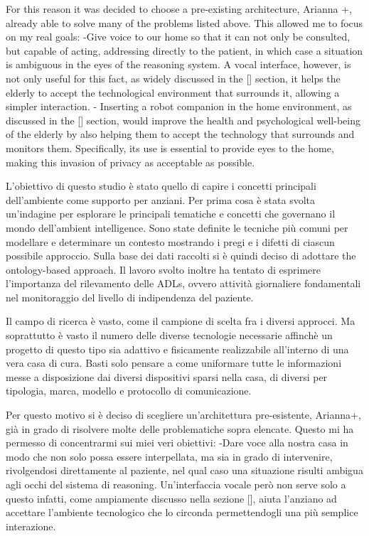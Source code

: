 \documentclass{thesisreport}
\begin{document}
 For this reason it was decided to choose a pre-existing architecture, Arianna +, already able to solve many of the problems listed above. This allowed me to focus on my real goals:
 -Give voice to our home so that it can not only be consulted, but capable of acting, addressing directly to the patient, in which case a situation is ambiguous in the eyes of the reasoning system.
 A vocal interface, however, is not only useful for this fact, as widely discussed in the [] section, it helps the elderly to accept the technological environment that surrounds it, allowing a simpler interaction.
 - Inserting a robot companion in the home environment, as discussed in the [] section, would improve the health and psychological well-being of the elderly by also helping them to accept the technology that surrounds and monitors them. Specifically, its use is essential to provide eyes to the home, making this invasion of privacy as acceptable as possible.
 
 
 L’obiettivo di questo studio è stato quello di capire i concetti principali dell'ambiente come supporto per anziani. 
Per prima cosa è stata svolta un’indagine per esplorare le principali tematiche e concetti che governano il mondo dell’ambient intelligence. 
Sono state definite le tecniche più comuni per modellare e determinare un contesto mostrando i pregi e i difetti di ciascun possibile approccio. Sulla base dei dati raccolti si è quindi deciso di adottare the ontology-based approach. 
Il lavoro svolto inoltre ha tentato di esprimere l’importanza del rilevamento delle ADLs, ovvero attività giornaliere fondamentali nel monitoraggio del livello di indipendenza del paziente.	

Il campo di ricerca è vasto, come il campione di scelta fra i diversi approcci. Ma soprattutto è vasto il numero delle diverse tecnologie necessarie affinchè un progetto di questo tipo sia adattivo e fisicamente realizzabile all'interno di una vera casa di cura. Basti solo pensare a come uniformare tutte le informazioni messe a disposizione dai diversi dispositivi sparsi nella casa, di diversi per tipologia, marca, modello e protocollo di comunicazione. 

Per questo motivo si è deciso di scegliere un'architettura pre-esistente, Arianna+, già in grado di  risolvere molte delle problematiche sopra elencate. Questo mi ha permesso di concentrarmi sui miei veri obiettivi:
-Dare voce alla nostra casa in modo che non solo possa essere interpellata, ma sia in grado di intervenire, rivolgendosi direttamente al paziente, nel qual caso una situazione risulti ambigua agli occhi del sistema di reasoning. 
Un'interfaccia vocale però non serve solo a questo infatti, come ampiamente discusso nella sezione [], aiuta l’anziano ad accettare l’ambiente tecnologico che lo circonda permettendogli una più semplice interazione.
	
\end{document}
